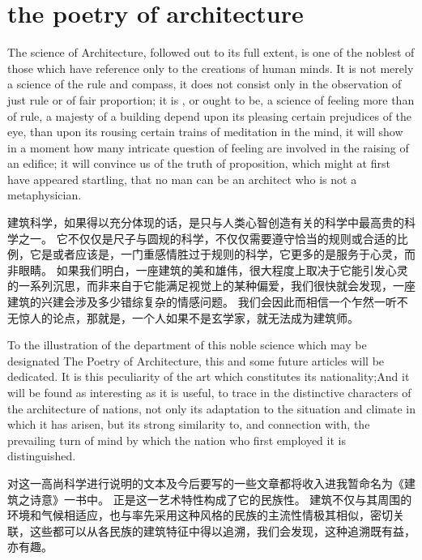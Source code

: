 \documentclass[cs4size, a4paper, 12pt]{article}
\newcounter{numpar}
\newcommand*{\newpar}{\numpar{}}
\begin{document}
	\section{the poetry of architecture}
	
	\setcounter{numpar}{0}
	
	\newpar The science of Architecture, followed out to its full extent, is one of the noblest of those which have reference only to the creations of human minds. It is not merely a science of the rule and compass, it does not consist only in the observation of just rule or of fair proportion; it is , or ought to be, a science of feeling more than of rule, a majesty of a building depend upon its pleasing certain prejudices of the eye, than upon its rousing certain trains of meditation in the mind, it will show in a moment how many intricate question of feeling are involved in the raising of an edifice; it will convince us of the truth of proposition, which might at first have appeared startling, that no man can be an architect who is not a metaphysician.
	
	建筑科学，如果得以充分体现的话，是只与人类心智创造有关的科学中最高贵的科学之一。 它不仅仅是尺子与圆规的科学，不仅仅需要遵守恰当的规则或合适的比例，它是或者应该是，一门重感情胜过于规则的科学，它更多的是服务于心灵，而非眼睛。 如果我们明白，一座建筑的美和雄伟，很大程度上取决于它能引发心灵的一系列沉思，而非来自于它能满足视觉上的某种偏爱，我们很快就会发现，一座建筑的兴建会涉及多少错综复杂的情感问题。 我们会因此而相信一个乍然一听不无惊人的论点，那就是，一个人如果不是玄学家，就无法成为建筑师。 
	
	\newpar To the illustration of the department of this noble science which may be designated The Poetry of Architecture, this and some future articles will be dedicated. It is this peculiarity of the art which constitutes its nationality;And it will be found as interesting as it is useful, to trace in the distinctive characters of the architecture of nations, not only its adaptation to the situation and climate in which it has arisen, but its strong similarity to, and connection with, the prevailing turn of mind by which the nation who first employed it is distinguished.
	
	对这一高尚科学进行说明的文本及今后要写的一些文章都将收入进我暂命名为《建筑之诗意》一书中。 正是这一艺术特性构成了它的民族性。 建筑不仅与其周围的环境和气候相适应，也与率先采用这种风格的民族的主流性情极其相似，密切关联，这些都可以从各民族的建筑特征中得以追溯，我们会发现，这种追溯既有益，亦有趣。 
	
\end{document}
